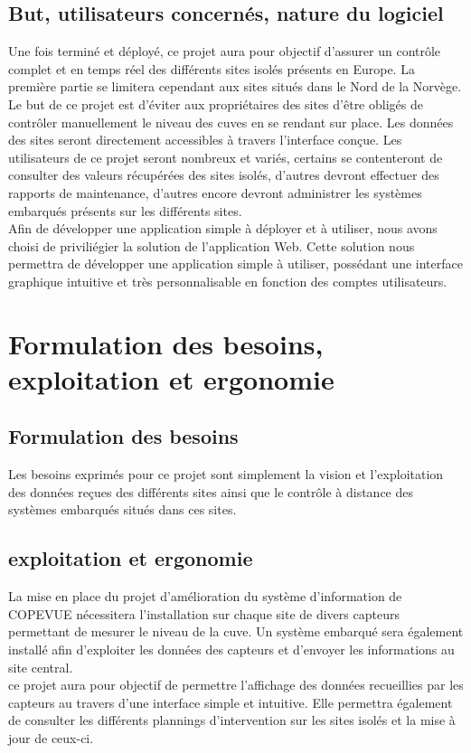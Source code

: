 \subsection{But, utilisateurs concernés, nature du logiciel}
Une fois terminé et déployé, ce projet aura pour objectif d'assurer un contrôle complet et en temps réel des différents sites isolés présents en Europe. La première partie se limitera cependant aux sites situés dans le Nord de la Norvège. Le but de ce projet est d'éviter aux propriétaires des sites d'être obligés de contrôler manuellement le niveau des cuves en se rendant sur place. Les données des sites seront directement accessibles à travers l'interface conçue. Les utilisateurs de ce projet seront nombreux et variés, certains se contenteront de consulter des valeurs récupérées des sites isolés, d'autres devront effectuer des rapports de maintenance, d'autres encore devront administrer les systèmes embarqués présents sur les différents sites. \\
Afin de développer une application simple à déployer et à utiliser, nous avons choisi de priviliégier la solution de l'application Web. Cette solution nous permettra de développer une application simple à utiliser, possédant une interface graphique intuitive et très personnalisable en fonction des comptes utilisateurs.

\section{Formulation des besoins, exploitation et ergonomie}
\subsection{Formulation des besoins}
Les besoins exprimés pour ce projet sont simplement la vision et l'exploitation des données reçues des différents sites ainsi que le contrôle à distance des systèmes embarqués situés dans ces sites.

\subsection{exploitation et ergonomie}
La mise en place du projet d'amélioration du système d'information de COPEVUE nécessitera l'installation sur chaque site de divers capteurs permettant de mesurer le niveau de la cuve. Un système embarqué sera également installé afin d'exploiter les données des capteurs et d'envoyer les informations au site central.\\
ce projet aura pour objectif de permettre l'affichage des données recueillies par les capteurs au travers d'une interface simple et intuitive. Elle permettra également de consulter les différents plannings d'intervention sur les sites isolés et la mise à jour de ceux-ci.

